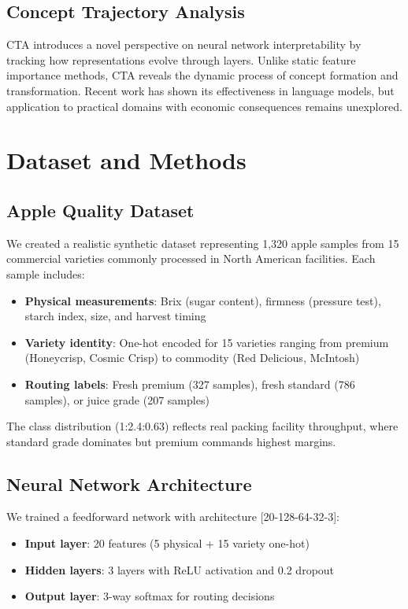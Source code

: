 \documentclass[11pt,a4paper]{article}
\begin{document}
\subsection{Concept Trajectory Analysis}

CTA introduces a novel perspective on neural network interpretability by tracking how representations evolve through layers. Unlike static feature importance methods, CTA reveals the dynamic process of concept formation and transformation. Recent work has shown its effectiveness in language models, but application to practical domains with economic consequences remains unexplored.

\section{Dataset and Methods}

\subsection{Apple Quality Dataset}

We created a realistic synthetic dataset representing 1,320 apple samples from 15 commercial varieties commonly processed in North American facilities. Each sample includes:

\begin{itemize}
    \item \textbf{Physical measurements}: Brix (sugar content), firmness (pressure test), starch index, size, and harvest timing
    \item \textbf{Variety identity}: One-hot encoded for 15 varieties ranging from premium (Honeycrisp, Cosmic Crisp) to commodity (Red Delicious, McIntosh)
    \item \textbf{Routing labels}: Fresh premium (327 samples), fresh standard (786 samples), or juice grade (207 samples)
\end{itemize}

The class distribution (1:2.4:0.63) reflects real packing facility throughput, where standard grade dominates but premium commands highest margins.

\subsection{Neural Network Architecture}

We trained a feedforward network with architecture [20-128-64-32-3]:
\begin{itemize}
    \item \textbf{Input layer}: 20 features (5 physical + 15 variety one-hot)
    \item \textbf{Hidden layers}: 3 layers with ReLU activation and 0.2 dropout
    \item \textbf{Output layer}: 3-way softmax for routing decisions
\end{itemize}
\end{document}
